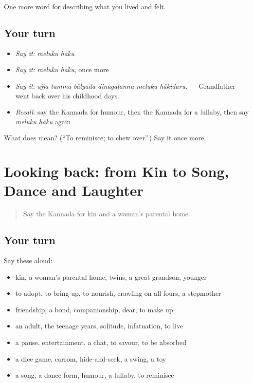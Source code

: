 \begin{grammarlens}[title={What you've built}]
One more word for describing what you lived and felt.
\end{grammarlens}

\subsection*{Your turn}
\begin{itemize}
\raggedright
  \item \emph{Say it:} \emph{meluku hāku}
  \item \emph{Say it:} \emph{meluku hāku}, once more
  \item \emph{Say it:} \emph{ajja tamma bālyada dinagaḷannu meluku hākidaru.} — Grandfather went back over his childhood days.
  \item \emph{Recall:} say the Kannada for humour, then the Kannada for a lullaby, then say \emph{meluku hāku} again
\end{itemize}

\begin{tcolorbox}[breakable,colback=teal!4,colframe=teal!35!black,title={Before you move on}]
What does   mean? (\textquotedblleft{}To reminisce; to chew over\textquotedblright{}.) Say it once more.
\end{tcolorbox}
\section[(dialogue)]{Looking back: from Kin to Song, Dance and Laughter}

\label{lesson:KA-R532-review-526-532}



\begin{quote}
Say the Kannada for kin and a woman's parental home.
\end{quote}

\subsection*{Your turn}
Say these aloud:

\begin{itemize}
\raggedright
  \item kin, a woman's parental home, twins, a great-grandson, younger
  \item to adopt, to bring up, to nourish, crawling on all fours, a stepmother
  \item friendship, a bond, companionship, dear, to make up
  \item an adult, the teenage years, solitude, infatuation, to live
  \item a pause, entertainment, a chat, to savour, to be absorbed
  \item a dice game, carrom, hide-and-seek, a swing, a toy
  \item a song, a dance form, humour, a lullaby, to reminisce
\end{itemize}

